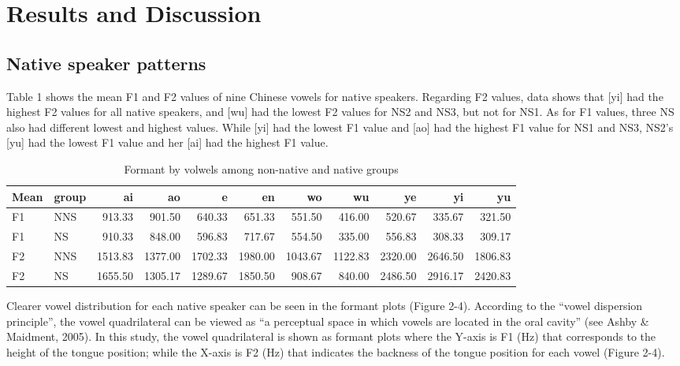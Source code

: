 \documentclass[man, fleqn, noextraspace]{apa6}
\begin{document}
\section{Results and Discussion}\label{results-and-discussion}

\subsection{Native speaker patterns}\label{native-speaker-patterns}

Table 1 shows the mean F1 and F2 values of nine Chinese vowels for
native speakers. Regarding F2 values, data shows that {[}yi{]} had the
highest F2 values for all native speakers, and {[}wu{]} had the lowest
F2 values for NS2 and NS3, but not for NS1. As for F1 values, three NS
also had different lowest and highest values. While {[}yi{]} had the
lowest F1 value and {[}ao{]} had the highest F1 value for NS1 and NS3,
NS2's {[}yu{]} had the lowest F1 value and her {[}ai{]} had the highest
F1 value.

\begin{table}

\caption{\label{tab:table1}Formant by volwels among non-native and native groups}
\centering
\begin{tabular}[t]{llrrrrrrrrr}
\toprule
Mean & group & ai & ao & e & en & wo & wu & ye & yi & yu\\
\midrule
F1 & NNS & 913.33 & 901.50 & 640.33 & 651.33 & 551.50 & 416.00 & 520.67 & 335.67 & 321.50\\
F1 & NS & 910.33 & 848.00 & 596.83 & 717.67 & 554.50 & 335.00 & 556.83 & 308.33 & 309.17\\
F2 & NNS & 1513.83 & 1377.00 & 1702.33 & 1980.00 & 1043.67 & 1122.83 & 2320.00 & 2646.50 & 1806.83\\
F2 & NS & 1655.50 & 1305.17 & 1289.67 & 1850.50 & 908.67 & 840.00 & 2486.50 & 2916.17 & 2420.83\\
\bottomrule
\end{tabular}
\end{table}

Clearer vowel distribution for each native speaker can be seen in the
formant plots (Figure 2-4). According to the \enquote{vowel dispersion
principle}, the vowel quadrilateral can be viewed as \enquote{a
perceptual space in which vowels are located in the oral cavity} (see
Ashby \& Maidment, 2005). In this study, the vowel quadrilateral is
shown as formant plots where the Y-axis is F1 (Hz) that corresponds to
the height of the tongue position; while the X-axis is F2 (Hz) that
indicates the backness of the tongue position for each vowel (Figure
2-4).
\end{document}
